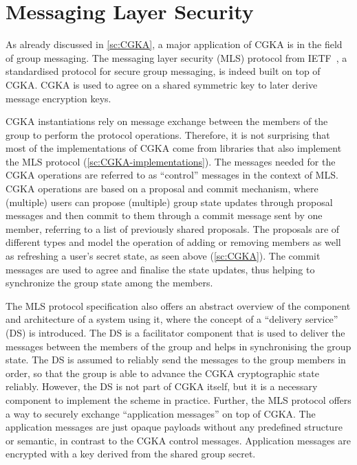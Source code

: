 \section{Messaging Layer Security}\label{sc:MLS}

As already discussed in \cref{sc:CGKA}, a major application of CGKA is in the field of group messaging.
The messaging layer security (MLS) protocol from IETF~\cite{rfc9420},
a standardised protocol for secure group messaging, is indeed 
built on top of CGKA. CGKA is used to agree on a shared symmetric key
to later derive message encryption keys.

CGKA instantiations rely on message exchange
between the members of the group to perform the protocol operations.
Therefore, it is not surprising that most of the implementations
of CGKA come from libraries that also implement the MLS protocol (\cref{sc:CGKA-implementations}).
The messages needed for the CGKA operations are referred to as ``control'' messages in the context of MLS.
CGKA operations are based on a proposal and commit mechanism,
where (multiple) users can propose (multiple) group state updates
through proposal messages and then commit to them through a commit message
sent by one member, referring to a list of previously shared proposals. 
The proposals are of different types and model the operation of adding or removing 
members as well as refreshing a user's secret state, as seen above (\cref{sc:CGKA}).
The commit messages are used to agree and finalise the state updates,
thus helping to synchronize the group state among the members.

The MLS protocol specification also offers an abstract overview of
the component and architecture of a system using it, 
where the concept of a ``delivery service''
(DS) is introduced. The DS is a facilitator component that is used to 
deliver the messages between the members of the group and helps in
synchronising the group state. The DS is assumed to reliably
send the messages to the group members in order, so that the
group is able to advance the CGKA cryptographic state reliably.
However, the DS is not part of CGKA itself,
but it is a necessary component to implement the scheme in practice.
Further, the MLS protocol offers a way to securely exchange ``application messages''
on top of CGKA. The application messages are just opaque payloads
without any predefined structure or semantic, in contrast to the
CGKA control messages.
Application messages are encrypted with a key derived from the shared group secret.

